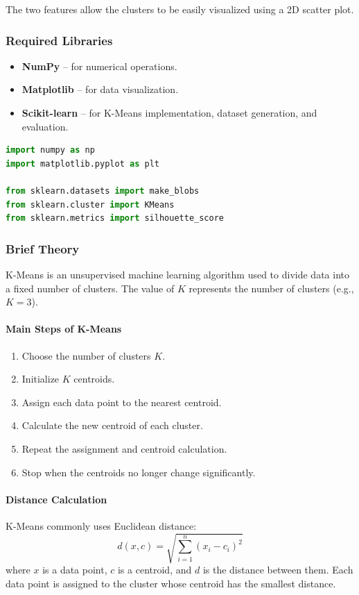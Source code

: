 \documentclass[a4paper,11pt]{article}
\begin{document}
The two features allow the clusters to be easily visualized using a 2D scatter plot.

\subsubsection{Required Libraries}
\begin{itemize}
    \item \textbf{NumPy} -- for numerical operations.
    \item \textbf{Matplotlib} -- for data visualization.
    \item \textbf{Scikit-learn} -- for K-Means implementation, dataset generation, and evaluation.
\end{itemize}

\begin{lstlisting}[language=Python, caption={Required Imports}]
import numpy as np
import matplotlib.pyplot as plt

from sklearn.datasets import make_blobs
from sklearn.cluster import KMeans
from sklearn.metrics import silhouette_score
\end{lstlisting}

\subsubsection{Brief Theory}
K-Means is an unsupervised machine learning algorithm used to divide data into a fixed number of clusters. The value of $K$ represents the number of clusters (e.g., $K = 3$).

\paragraph{Main Steps of K-Means}
\begin{enumerate}
    \item Choose the number of clusters $K$.
    \item Initialize $K$ centroids.
    \item Assign each data point to the nearest centroid.
    \item Calculate the new centroid of each cluster.
    \item Repeat the assignment and centroid calculation.
    \item Stop when the centroids no longer change significantly.
\end{enumerate}

\paragraph{Distance Calculation}
K-Means commonly uses Euclidean distance:
\[
d(x, c) = \sqrt{\sum_{i=1}^{n}(x_i - c_i)^2}
\]
where $x$ is a data point, $c$ is a centroid, and $d$ is the distance between them. Each data point is assigned to the cluster whose centroid has the smallest distance.
\end{document}
